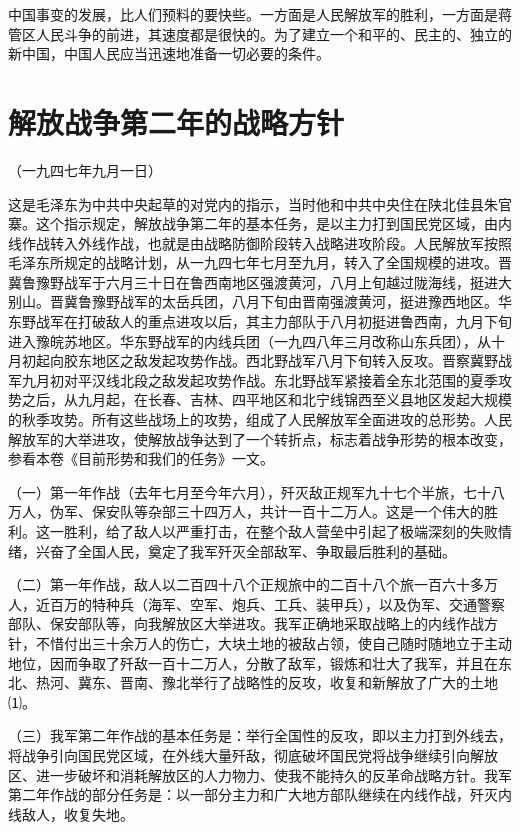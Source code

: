 \documentclass[UTF-8, a5paper, 12pt]{ctexart}
\begin{document}
中国事变的发展，比人们预料的要快些。一方面是人民解放军的胜利，一方面是蒋管区人民斗争的前进，其速度都是很快的。为了建立一个和平的、民主的、独立的新中国，中国人民应当迅速地准备一切必要的条件。


\section{解放战争第二年的战略方针}

（一九四七年九月一日）

这是毛泽东为中共中央起草的对党内的指示，当时他和中共中央住在陕北佳县朱官寨。这个指示规定，解放战争第二年的基本任务，是以主力打到国民党区域，由内线作战转入外线作战，也就是由战略防御阶段转入战略进攻阶段。人民解放军按照毛泽东所规定的战略计划，从一九四七年七月至九月，转入了全国规模的进攻。晋冀鲁豫野战军于六月三十日在鲁西南地区强渡黄河，八月上旬越过陇海线，挺进大别山。晋冀鲁豫野战军的太岳兵团，八月下旬由晋南强渡黄河，挺进豫西地区。华东野战军在打破敌人的重点进攻以后，其主力部队于八月初挺进鲁西南，九月下旬进入豫皖苏地区。华东野战军的内线兵团（一九四八年三月改称山东兵团），从十月初起向胶东地区之敌发起攻势作战。西北野战军八月下旬转入反攻。晋察冀野战军九月初对平汉线北段之敌发起攻势作战。东北野战军紧接着全东北范围的夏季攻势之后，从九月起，在长春、吉林、四平地区和北宁线锦西至义县地区发起大规模的秋季攻势。所有这些战场上的攻势，组成了人民解放军全面进攻的总形势。人民解放军的大举进攻，使解放战争达到了一个转折点，标志着战争形势的根本改变，参看本卷《目前形势和我们的任务》一文。

（一）第一年作战（去年七月至今年六月），歼灭敌正规军九十七个半旅，七十八万人，伪军、保安队等杂部三十四万人，共计一百十二万人。这是一个伟大的胜利。这一胜利，给了敌人以严重打击，在整个敌人营垒中引起了极端深刻的失败情绪，兴奋了全国人民，奠定了我军歼灭全部敌军、争取最后胜利的基础。

（二）第一年作战，敌人以二百四十八个正规旅中的二百十八个旅一百六十多万人，近百万的特种兵（海军、空军、炮兵、工兵、装甲兵），以及伪军、交通警察部队、保安部队等，向我解放区大举进攻。我军正确地采取战略上的内线作战方针，不惜付出三十余万人的伤亡，大块土地的被敌占领，使自己随时随地立于主动地位，因而争取了歼敌一百十二万人，分散了敌军，锻炼和壮大了我军，并且在东北、热河、冀东、晋南、豫北举行了战略性的反攻，收复和新解放了广大的土地⑴。

（三）我军第二年作战的基本任务是：举行全国性的反攻，即以主力打到外线去，将战争引向国民党区域，在外线大量歼敌，彻底破坏国民党将战争继续引向解放区、进一步破坏和消耗解放区的人力物力、使我不能持久的反革命战略方针。我军第二年作战的部分任务是：以一部分主力和广大地方部队继续在内线作战，歼灭内线敌人，收复失地。
\end{document}
